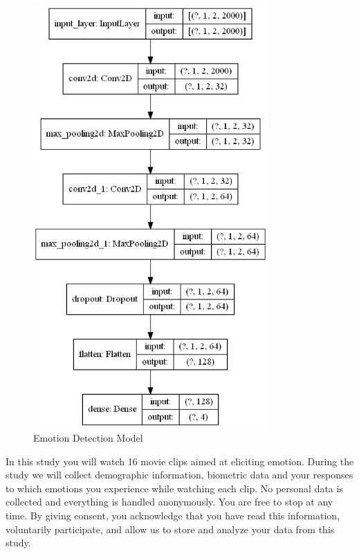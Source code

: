 \begin{figure}[H]
    \centering
    \includegraphics[width=0.8\textwidth]{figures/Emotion_Detetion_Model.png}
    \caption{Emotion Detection Model}
    \label{fig:EmotionDetectionModel}
\end{figure}

In this study you will watch 16 movie clips aimed at eliciting emotion. During the study we will collect demographic information, biometric data and your responses to which emotions you experience while watching each clip. No personal data is collected and everything is handled anonymously. You are free to stop at any time. By giving consent, you acknowledge that you have read this information, voluntarily participate, and allow us to store and analyze your data from this study.
